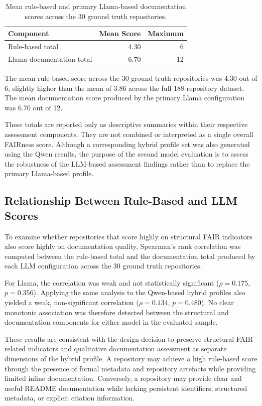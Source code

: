 \begin{table}[h]
\centering
\caption{Mean rule-based and primary Llama-based documentation scores
across the 30 ground truth repositories.}
\label{tab:hybrid_summary}
\begin{tabular}{lrr}
\hline
\textbf{Component} & \textbf{Mean Score} & \textbf{Maximum} \\
\hline
Rule-based total & 4.30 & 6 \\
Llama documentation total & 6.70 & 12 \\
\hline
\end{tabular}
\end{table}

The mean rule-based score across the 30 ground truth repositories was
4.30 out of 6, slightly higher than the mean of 3.86 across the full
188-repository dataset. The mean documentation score produced by the
primary Llama configuration was 6.70 out of 12.

These totals are reported only as descriptive summaries within their
respective assessment components. They are not combined or interpreted
as a single overall FAIRness score. Although a corresponding hybrid profile set was also generated using the
Qwen results, the purpose of the second model evaluation is to assess the
robustness of the LLM-based assessment findings rather than to replace the
primary Llama-based profile.

\subsection{Relationship Between Rule-Based and LLM Scores}

To examine whether repositories that score highly on structural FAIR
indicators also score highly on documentation quality, Spearman's rank
correlation was computed between the rule-based total and the documentation
total produced by each LLM configuration across the 30 ground truth
repositories.

For Llama, the correlation was weak and not statistically significant
($\rho=0.175$, $p=0.356$). Applying the same analysis to the Qwen-based
hybrid profiles also yielded a weak, non-significant correlation
($\rho=0.134$, $p=0.480$). No clear monotonic association was therefore
detected between the structural and documentation components for either
model in the evaluated sample.

These results are consistent with the design decision to preserve structural
FAIR-related indicators and qualitative documentation assessment as
separate dimensions of the hybrid profile. A repository may achieve a
high rule-based score through the presence of formal metadata and
repository artefacts while providing limited inline documentation.
Conversely, a repository may provide clear and useful README
documentation while lacking persistent identifiers, structured
metadata, or explicit citation information.

